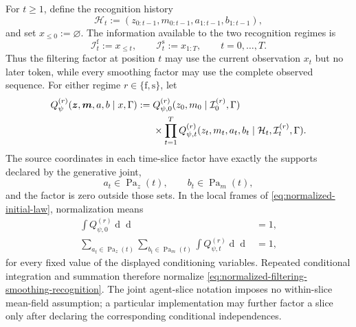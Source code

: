 For $t\geq1$, define the recognition history
\begin{equation}
\mathcal H_t
:=(z_{0:t-1},m_{0:t-1},a_{1:t-1},b_{1:t-1}),
\label{eq:recognition-history}
\end{equation}
and set $x_{\leq0}:=\varnothing$.  The information available to the two recognition regimes is
\begin{equation}
\mathcal I_t^{\mathrm f}:=x_{\leq t},
\qquad
\mathcal I_t^{\mathrm s}:=x_{1:T},
\qquad t=0,\ldots,T.
\label{eq:filtering-smoothing-information}
\end{equation}
Thus the filtering factor at position $t$ may use the current observation $x_t$ but no later token, while every smoothing factor may use the complete observed sequence.  For either regime $r\in\{\mathrm f,\mathrm s\}$, let
\begin{equation}
\begin{aligned}
Q_\psi^{(r)}(\boldsymbol z,\boldsymbol m,a,b\mid x,\Gamma)
:={}&Q_{\psi,0}^{(r)}
(z_0,m_0\mid\mathcal I_0^{(r)},\Gamma)\\
&\times\prod_{t=1}^{T}
Q_{\psi,t}^{(r)}
(z_t,m_t,a_t,b_t\mid
\mathcal H_t,\mathcal I_t^{(r)},\Gamma).
\end{aligned}
\label{eq:normalized-filtering-smoothing-recognition}
\end{equation}
The source coordinates in each time-slice factor have exactly the supports declared by the generative joint,
\begin{equation}
a_t\in\operatorname{Pa}_z(t),
\qquad
b_t\in\operatorname{Pa}_m(t),
\label{eq:recognition-source-supports}
\end{equation}
and the factor is zero outside those sets.  In the local frames of \cref{eq:normalized-initial-law}, normalization means
\begin{equation}
\begin{aligned}
\int Q_{\psi,0}^{(r)}
\mathop{\mathrm d\lambda_{z,0}}
\mathop{\mathrm d\lambda_{m,0}}&=1,\\
\sum_{a_t\in\operatorname{Pa}_z(t)}
\sum_{b_t\in\operatorname{Pa}_m(t)}
\int Q_{\psi,t}^{(r)}
\mathop{\mathrm d\lambda_{z,t}}
\mathop{\mathrm d\lambda_{m,t}}&=1,
\end{aligned}
\label{eq:recognition-factor-normalization}
\end{equation}
for every fixed value of the displayed conditioning variables. Repeated conditional integration and summation therefore normalize \cref{eq:normalized-filtering-smoothing-recognition}. The joint agent-slice notation imposes no within-slice mean-field assumption; a particular implementation may further factor a slice only after declaring the corresponding conditional independences.


